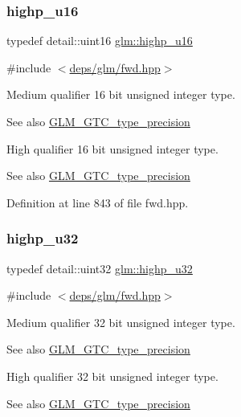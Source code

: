 \subsubsection{\texorpdfstring{highp\+\_\+u16}{highp\_u16}}
{\footnotesize\ttfamily typedef detail\+::uint16 \hyperlink{group__gtc__type__precision_ga9da2178d7501d9c0f225fa1a7b70cb45}{glm\+::highp\+\_\+u16}}



{\ttfamily \#include $<$\hyperlink{fwd_8hpp}{deps/glm/fwd.\+hpp}$>$}

Medium qualifier 16 bit unsigned integer type. \begin{DoxySeeAlso}{See also}
\hyperlink{group__gtc__type__precision}{G\+L\+M\+\_\+\+G\+T\+C\+\_\+type\+\_\+precision}
\end{DoxySeeAlso}
High qualifier 16 bit unsigned integer type. \begin{DoxySeeAlso}{See also}
\hyperlink{group__gtc__type__precision}{G\+L\+M\+\_\+\+G\+T\+C\+\_\+type\+\_\+precision} 
\end{DoxySeeAlso}


Definition at line 843 of file fwd.\+hpp.

\mbox{\label{group__gtc__type__precision_gae8e8a2c712653891a03c171795286ac5}} 
\subsubsection{\texorpdfstring{highp\+\_\+u32}{highp\_u32}}
{\footnotesize\ttfamily typedef detail\+::uint32 \hyperlink{group__gtc__type__precision_gae8e8a2c712653891a03c171795286ac5}{glm\+::highp\+\_\+u32}}



{\ttfamily \#include $<$\hyperlink{fwd_8hpp}{deps/glm/fwd.\+hpp}$>$}

Medium qualifier 32 bit unsigned integer type. \begin{DoxySeeAlso}{See also}
\hyperlink{group__gtc__type__precision}{G\+L\+M\+\_\+\+G\+T\+C\+\_\+type\+\_\+precision}
\end{DoxySeeAlso}
High qualifier 32 bit unsigned integer type. \begin{DoxySeeAlso}{See also}
\hyperlink{group__gtc__type__precision}{G\+L\+M\+\_\+\+G\+T\+C\+\_\+type\+\_\+precision} 
\end{DoxySeeAlso}


